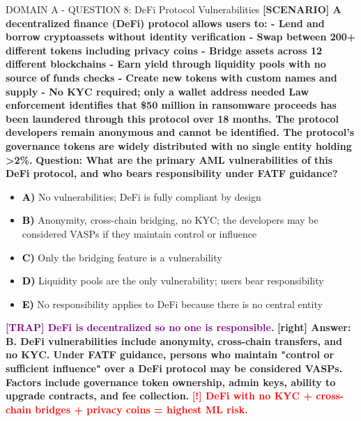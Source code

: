 \documentclass[11pt,a4paper]{beamer}
\newcommand{\redflag}[1]{\textcolor{red}{\textbf{[!] #1}}}
\newcommand{\trap}[1]{\textcolor{purple}{\textbf{[TRAP] #1}}}
\newcommand{\correct}[1]{\textcolor{green!50!black}{\textbf{[right] #1}}}
\newcommand{\scenario}[1]{\textcolor{blue!70!black}{\textbf{[SCENARIO] #1}}}
\newcommand{\option}[1]{\textcolor{black}{\textbf{#1}}}
\begin{document}
\begin{frame}{DOMAIN A - QUESTION 8: DeFi Protocol Vulnerabilities}
\scenario{A decentralized finance (DeFi) protocol allows users to:
- Lend and borrow cryptoassets without identity verification
- Swap between 200+ different tokens including privacy coins
- Bridge assets across 12 different blockchains
- Earn yield through liquidity pools with no source of funds checks
- Create new tokens with custom names and supply
- No KYC required; only a wallet address needed
Law enforcement identifies that \$50 million in ransomware proceeds has been laundered through this protocol over 18 months. The protocol developers remain anonymous and cannot be identified. The protocol's governance tokens are widely distributed with no single entity holding >2\%.}
\vspace{0.2cm}
\textbf{Question: What are the primary AML vulnerabilities of this DeFi protocol, and who bears responsibility under FATF guidance?}
\vspace{0.1cm}
\begin{itemize}
    \item \option{A)} No vulnerabilities; DeFi is fully compliant by design
    \item \option{B)} Anonymity, cross-chain bridging, no KYC; the developers may be considered VASPs if they maintain control or influence
    \item \option{C)} Only the bridging feature is a vulnerability
    \item \option{D)} Liquidity pools are the only vulnerability; users bear responsibility
    \item \option{E)} No responsibility applies to DeFi because there is no central entity
\end{itemize}
\vspace{0.2cm}
\trap{DeFi is decentralized so no one is responsible.}
\correct{Answer: B. DeFi vulnerabilities include anonymity, cross-chain transfers, and no KYC. Under FATF guidance, persons who maintain "control or sufficient influence" over a DeFi protocol may be considered VASPs. Factors include governance token ownership, admin keys, ability to upgrade contracts, and fee collection.}
\redflag{DeFi with no KYC + cross-chain bridges + privacy coins = highest ML risk.}
\end{frame}
\end{document}

